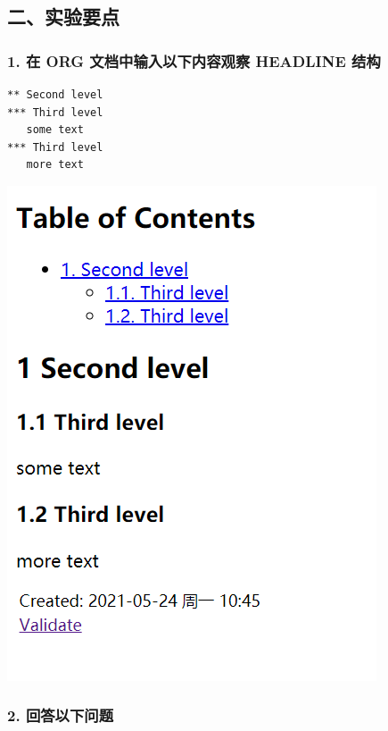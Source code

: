\documentclass[UTF8]{ctexart}
\begin{document}
\subsection*{二、实验要点}
\label{sec:org901dc45}
\subsubsection*{1. 在 ORG 文档中输入以下内容观察 HEADLINE 结构}
\label{sec:org922d01f}
\begin{verbatim}
** Second level
*** Third level
   some text
*** Third level
   more text
\end{verbatim}

\begin{center}
\includegraphics[width=.9\linewidth]{image/14.png}
\end{center}
\subsubsection*{2. 回答以下问题}
\label{sec:orgbe24784}
\end{document}
